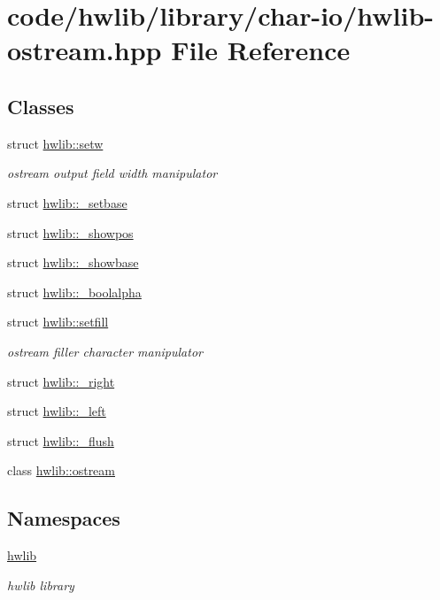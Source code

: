 \hypertarget{hwlib-ostream_8hpp}{}\section{code/hwlib/library/char-\/io/hwlib-\/ostream.hpp File Reference}
\label{hwlib-ostream_8hpp}
\subsection*{Classes}
\begin{DoxyCompactItemize}
\item 
struct \hyperlink{structhwlib_1_1setw}{hwlib\+::setw}
\begin{DoxyCompactList}\small\item\em ostream output field width manipulator \end{DoxyCompactList}\item 
struct \hyperlink{structhwlib_1_1__setbase}{hwlib\+::\+\_\+setbase}
\item 
struct \hyperlink{structhwlib_1_1__showpos}{hwlib\+::\+\_\+showpos}
\item 
struct \hyperlink{structhwlib_1_1__showbase}{hwlib\+::\+\_\+showbase}
\item 
struct \hyperlink{structhwlib_1_1__boolalpha}{hwlib\+::\+\_\+boolalpha}
\item 
struct \hyperlink{structhwlib_1_1setfill}{hwlib\+::setfill}
\begin{DoxyCompactList}\small\item\em ostream filler character manipulator \end{DoxyCompactList}\item 
struct \hyperlink{structhwlib_1_1__right}{hwlib\+::\+\_\+right}
\item 
struct \hyperlink{structhwlib_1_1__left}{hwlib\+::\+\_\+left}
\item 
struct \hyperlink{structhwlib_1_1__flush}{hwlib\+::\+\_\+flush}
\item 
class \hyperlink{classhwlib_1_1ostream}{hwlib\+::ostream}
\end{DoxyCompactItemize}
\subsection*{Namespaces}
\begin{DoxyCompactItemize}
\item 
 \hyperlink{namespacehwlib}{hwlib}
\begin{DoxyCompactList}\small\item\em hwlib library \end{DoxyCompactList}\end{DoxyCompactItemize}
